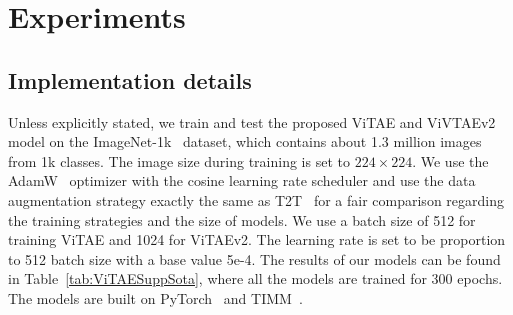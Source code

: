 \documentclass[twocolumn]{svjour3}          \smartqed  \usepackage{natbib}
\begin{document}
\section{Experiments}
\label{sec:ViTAEexperi}
\subsection{Implementation details}
\label{subsec:impl}

Unless explicitly stated, we train and test the proposed ViTAE and ViVTAEv2 model on the ImageNet-1k~\citep{krizhevsky2012imagenet} dataset, which contains about 1.3 million images from 1k classes. The image size during training is set to $224 \times 224$. We use the AdamW~\citep{loshchilov2018decoupled} optimizer with the cosine learning rate scheduler and use the data augmentation strategy exactly the same as T2T~\citep{yuan2021tokens} for a fair comparison regarding the training strategies and the size of models. We use a batch size of 512 for training ViTAE and 1024 for ViTAEv2. The learning rate is set to be proportion to 512 batch size with a base value 5e-4. The results of our models can be found in Table~\ref{tab:ViTAESuppSota}, where all the models are trained for 300 epochs. The models are built on PyTorch~\citep{paszke2019pytorch} and TIMM~\citep{rw2019timm}.
\end{document}
